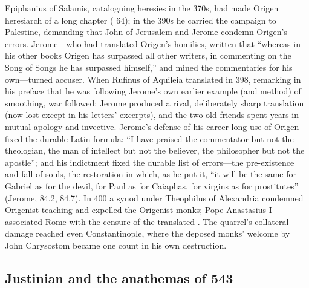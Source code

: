 Epiphanius of Salamis, cataloguing heresies in the 370s, had made Origen
heresiarch of a long chapter ( 64); in the 390s he carried
the campaign to Palestine, demanding that John of Jerusalem and Jerome
condemn Origen's errors. Jerome---who had translated Origen's homilies,
written that ``whereas in his other books Origen has surpassed all other
writers, in commenting on the Song of Songs he has surpassed himself,'' and
mined the commentaries for his own---turned accuser. When
Rufinus of Aquileia translated  in 398, remarking
in his preface that he was following Jerome's own earlier example (and
method) of smoothing, war followed: Jerome produced a rival, deliberately
sharp translation (now lost except in his letters' excerpts), and the two
old friends spent years in mutual apology and invective. Jerome's defense
of his career-long use of Origen fixed the durable Latin formula: ``I have
praised the commentator but not the theologian, the man of intellect but
not the believer, the philosopher but not the apostle''; and his indictment
fixed the durable list of errors---the pre-existence and fall of souls, the
restoration in which, as he put it, ``it will be the same for Gabriel as
for the devil, for Paul as for Caiaphas, for virgins as for prostitutes''
(Jerome,  84.2, 84.7). In 400 a synod under Theophilus of
Alexandria condemned Origenist teaching and expelled the Origenist monks;
Pope Anastasius I associated Rome with the censure of the translated
. The quarrel's collateral damage reached even
Constantinople, where the deposed monks' welcome by John Chrysostom became
one count in his own destruction.


\subsection{Justinian and the anathemas of 543}

